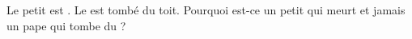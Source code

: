 \beginnumbering
\pstart
Le petit  est .
Le  est tombé du toit.
Pourquoi est-ce  un petit  qui meurt et jamais un pape qui tombe du   ?
\pend
\endnumbering
